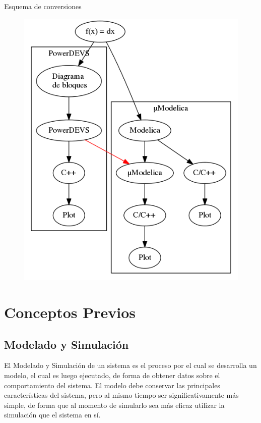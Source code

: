 \documentclass[10pt,handout]{beamer}
\begin{document}
\begin{frame}{Esquema de conversiones}
\begin{figure}
\centering
 \includegraphics[width=.60\linewidth]{esquema}
\end{figure}
\end{frame}

\section{Conceptos Previos}
	\subsection{Modelado y Simulación}
\begin{frame}
\begin{block}{El Modelado y Simulación}
de un sistema es el proceso por el cual se desarrolla un modelo, el cual es luego ejecutado, de forma de obtener datos sobre el comportamiento del sistema. El modelo debe conservar las principales características del sistema, pero al mismo tiempo ser significativamente más simple, de forma que al momento de simularlo sea más eficaz utilizar la simulación que el sistema en sí.
\end{block}
\end{frame}
\end{document}
